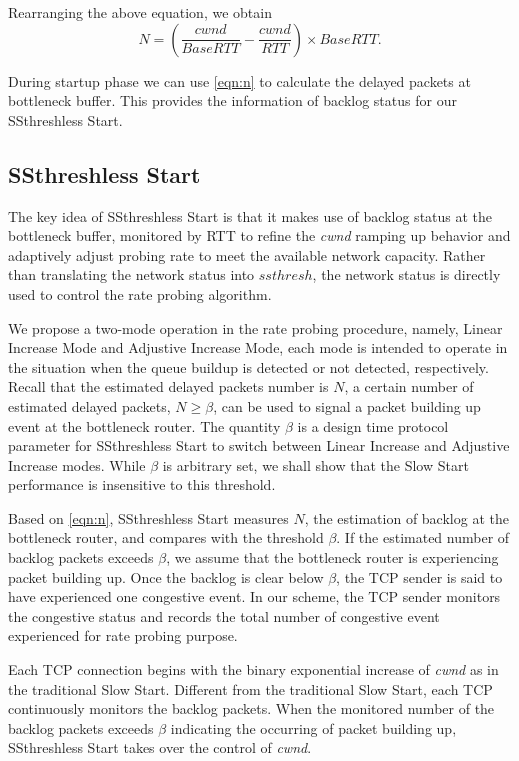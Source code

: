 \documentclass[12pt,onecolumn]{IEEEtran}
\begin{document}
Rearranging the above equation, we obtain
\begin{equation} \label{eqn:n}
N = \left(\frac{cwnd}{BaseRTT}-\frac{cwnd}{RTT}\right)\times BaseRTT.
\end{equation}


During startup phase we can use \eqref{eqn:n} to calculate the delayed packets
at bottleneck buffer. This provides the information of backlog status for our
SSthreshless Start.

\subsection{SSthreshless Start}

The key idea of SSthreshless Start is that it makes use of backlog status at
the bottleneck buffer, monitored by RTT to refine the \emph{cwnd} ramping up
behavior and adaptively adjust probing rate to meet the available network
capacity. Rather than translating the network status into $ssthresh$, the
network status is directly used to control the rate probing algorithm.

We propose a two-mode operation in the rate probing procedure, namely, Linear
Increase Mode and Adjustive Increase Mode, each mode is intended to operate in
the situation when the queue buildup is detected or not detected,
respectively. Recall that the estimated delayed packets number is $N$, a
certain number of estimated delayed packets, $N \geq \beta$, can be used to
signal a packet building up event at the bottleneck router. The quantity
$\beta$ is a design time protocol parameter for SSthreshless Start to switch
between Linear Increase and Adjustive Increase modes.
While $\beta$ is arbitrary set, we shall show that the Slow Start performance
is insensitive to this threshold.

Based on \eqref{eqn:n}, SSthreshless Start measures $N$, the estimation of
backlog at the bottleneck router, and compares with the threshold $\beta$. If
the estimated number of backlog packets exceeds $\beta$, we assume that the
bottleneck router is experiencing packet building up. Once the backlog is clear
below $\beta$, the TCP sender is said to have experienced one congestive event.
In our scheme, the TCP sender monitors the congestive status and records the
total number of congestive event experienced for rate probing purpose.

Each TCP connection begins with the binary exponential increase of \emph{cwnd}
as in the traditional Slow Start. Different from the traditional Slow Start,
each TCP continuously monitors the backlog packets. When the monitored number
of the backlog packets exceeds $\beta$ indicating the occurring of packet
building up, SSthreshless Start takes over the control of \emph{cwnd}.
\end{document}
